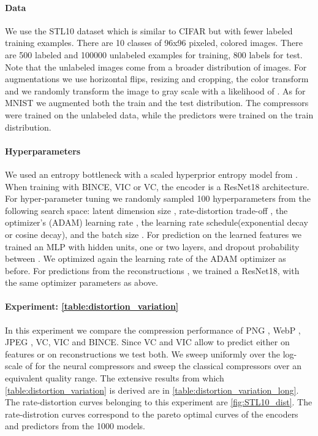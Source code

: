 \documentclass[final]{article}
\begin{document}
\paragraph{Data}
We use the STL10 dataset \cite{coates_analysis_2011} which is similar to CIFAR but with fewer labeled training examples. There are 10 classes of 96x96 pixeled, colored images. There are 500 labeled and 100000 unlabeled examples for training, 800 labels for test. Note that the unlabeled images come from a broader distribution of images.
For augmentations we use horizontal flips, resizing and cropping, the color transform and we randomly transform the image to gray scale with a likelihood of .
As for MNIST we augmented both the train and the test distribution.
The compressors were trained on the unlabeled data, while the predictors were trained on the train distribution.

\paragraph{Hyperparameters}
We used an entropy bottleneck with a scaled hyperprior entropy model from \cite{balle_variational_2018}.  
When training with BINCE, VIC or VC, the encoder is a ResNet18 architecture. For hyper-parameter tuning we randomly sampled 100 hyperparameters from the following search space:  latent dimension size , rate-distortion trade-off  , the optimizer's (ADAM) learning rate , the learning rate schedule(exponential decay or cosine decay), and the batch size .
For prediction on the learned features we trained an MLP with  hidden units, one or two layers, and dropout probability between . We optimized again the learning rate of the ADAM optimizer as before.
For predictions from the reconstructions  , we trained a ResNet18, with the same optimizer parameters as above.

\paragraph{Experiment: \cref{table:distortion_variation}}
In this experiment we compare the compression performance of PNG \cite{graphics_png_isoiec_2003}, WebP \cite{webp_google_2018}, JPEG \cite{group_jpeg_itu-t_1992}, VC, VIC and BINCE. 
Since VC and VIC allow to predict either on features or on reconstructions we test both. We sweep uniformly over the log-scale of  for the neural compressors and sweep the classical compressors over an equivalent quality range. 
The extensive results from which \cref{table:distortion_variation} is derived are in \cref{table:distortion_variation_long}. The rate-distortion curves belonging to this experiment are \cref{fig:STL10_dist}.
The rate-distrotion curves correspond to the pareto optimal curves of the encoders and predictors from the 1000 models.
\end{document}
